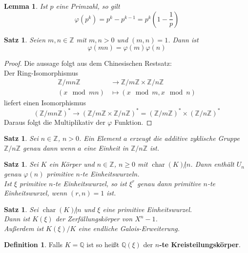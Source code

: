 \documentclass[10pt,a4paper]{article}
\newcommand{\Z}{\ensuremath{\mathbb{Z}}}
\newcommand{\Q}{\ensuremath{\mathbb{Q}}}
\newcommand{\cha}{\operatorname{char}}
\theoremstyle{plain}
\newtheorem{lem}[theorem]{Lemma}
\newtheorem{satz}[theorem]{Satz}
\theoremstyle{definition}
\newtheorem{definition}[theorem]{Definition}
\theoremstyle{remark}
\begin{document}
	\begin{lem}
		Ist $p$ eine Primzahl, so gilt
		\[\varphi(p^k)=p^k-p^{k-1}=p^k(1-\frac{1}{p})\]
	\end{lem}

	\begin{satz}
		Seien $m,n\in\Z$ mit $m,n>0$ und $(m,n)=1$. Dann ist
		\[\varphi(mn)=\varphi(m)\varphi(n)\]
	\end{satz}
	\begin{proof}
		Die aussage folgt aus dem Chinesischen Restsatz:\\
		Der Ring-Isomorphismus
		\begin{align*}
		\Z/mn\Z&\to \Z/m\Z\times \Z/n\Z\\
		(x\mod mn)&\mapsto(x\mod m,x\mod n)
		\end{align*}
		liefert einen Isomorphismus
		\[(\Z/mn\Z)^*\to(\Z/m\Z\times \Z/n\Z)^*=(\Z/m\Z)^*\times (\Z/n\Z)^*\]
		Daraus folgt die Multiplikativ der $\varphi$ Funktion.
	\end{proof}

	\begin{satz}
		Sei $n\in\Z$, $n>0$. Ein Element $a$ erzeugt die additive zyklische Gruppe $\Z/n\Z$ genau dann wenn $a$ eine Einheit in $\Z/n\Z$ ist.
	\end{satz}

	\begin{satz}
		Sei $K$ ein Körper und $n\in\Z$, $n\geq0$ mit $\cha(K)\not|n$. Dann enthält $U_n$ genau $\varphi(n)$ primitive $n$-te Einheitswurzeln.\\
		Ist $\xi$ primitive $n$-te Einheitswurzel, so ist $\xi^r$ genau dann primitive $n$-te Einheitswurzel, wenn $(r,n)=1$ ist.
	\end{satz}
	
	
	\begin{satz}
		Sei $\cha(K)\not|n$ und $\xi$ eine primitive Einheitswurzel.\\
		Dann ist $K(\xi)$ der Zerfällungskörper
		 von $X^n-1$.\\
		 Außerdem ist $K(\xi)/K$ eine endliche Galois-Erweiterung.
	\end{satz}
	\begin{definition}
		Falls $K=\Q$ ist so heißt $\Q(\xi)$ der \textbf{$n$-te Kreisteilungskörper}.
	\end{definition}
\end{document}
